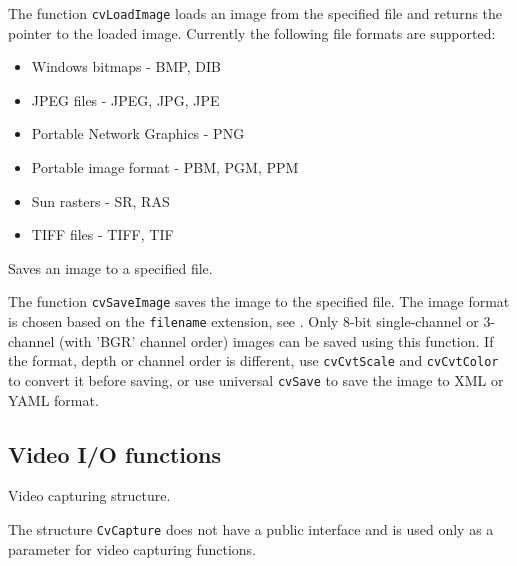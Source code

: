 The function \texttt{cvLoadImage} loads an image from the specified file and returns the pointer to the loaded image. Currently the following file formats are supported:
\begin{itemize}
\item Windows bitmaps - BMP, DIB
\item JPEG files - JPEG, JPG, JPE
\item Portable Network Graphics - PNG
\item Portable image format - PBM, PGM, PPM
\item Sun rasters - SR, RAS
\item TIFF files - TIFF, TIF
\end{itemize}


Saves an image to a specified file.


\begin{description}
\end{description}

The function \texttt{cvSaveImage} saves the image to the specified file. The image format is chosen based on the \texttt{filename} extension, see . Only 8-bit single-channel or 3-channel (with 'BGR' channel order) images can be saved using this function. If the format, depth or channel order is different, use \texttt{cvCvtScale} and \texttt{cvCvtColor} to convert it before saving, or use universal \texttt{cvSave} to save the image to XML or YAML format.

\subsection{Video I/O functions}

\label{CvCapture}

Video capturing structure.

\ifC
{}
\fi

The structure \texttt{CvCapture} does not have a public interface and is used only as a parameter for video capturing functions.


